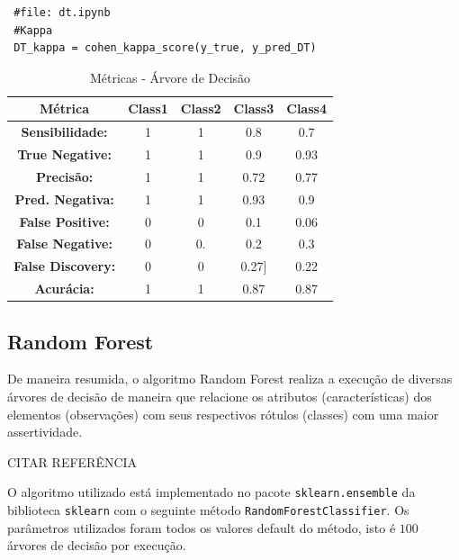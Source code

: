 \documentclass[
	article,			%
	11pt,				%
	oneside,			%
	a4paper,			%
	english,			%
	brazil,				%
	sumario=tradicional
	]{abntex2}
\begin{document}
\begin{verbatim}
 #file: dt.ipynb
 #Kappa
 DT_kappa = cohen_kappa_score(y_true, y_pred_DT)
\end{verbatim}

\begin{table}[h!]
\centering
\begin{tabular}{|c|c|c|c|c|}
\hline
\textbf{Métrica}         & \textbf{Class1} & \textbf{Class2} & \textbf{Class3} & \textbf{Class4} \\ \hline
\textbf{Sensibilidade:}  & 1               & 1               & 0.8             & 0.7             \\ \hline
\textbf{True Negative:}  & 1               & 1               & 0.9             & 0.93            \\ \hline
\textbf{Precisão:}       & 1               & 1               & 0.72            & 0.77            \\ \hline
\textbf{Pred. Negativa:} & 1               & 1               & 0.93            & 0.9             \\ \hline
\textbf{False Positive:} & 0               & 0               & 0.1             & 0.06            \\ \hline
\textbf{False Negative:} & 0               & 0.              & 0.2             & 0.3             \\ \hline
\textbf{False Discovery:}    & 0               & 0               & 0.27{]}         & 0.22            \\ \hline
\textbf{Acurácia:}       & 1               & 1               & 0.87            & 0.87            \\ \hline
\end{tabular}
\caption{Métricas - Árvore de Decisão}
\label{tab:metrics_dt}
\end{table}


\subsection{Random Forest}

De maneira resumida, o algoritmo Random Forest realiza a execução de diversas árvores de decisão de maneira que  relacione os atributos (características) dos elementos (observações) com seus respectivos rótulos (classes) com uma maior assertividade. 

CITAR REFERÊNCIA

O algoritmo utilizado está implementado no pacote \verb|sklearn.ensemble| da biblioteca \verb|sklearn| com o seguinte método \verb|RandomForestClassifier|. Os parâmetros utilizados foram todos os valores default do método, isto é $100$ árvores de decisão por execução.
\end{document}
